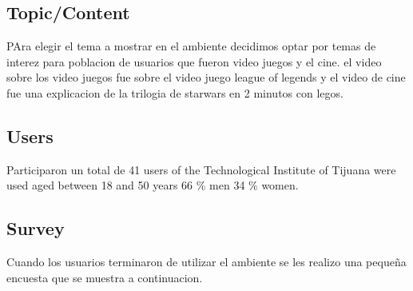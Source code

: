 \subsection{Topic/Content}
PAra elegir el tema a mostrar en el ambiente decidimos optar por temas de interez para poblacion de usuarios que fueron video juegos y el cine. el video sobre los video juegos fue sobre el video juego league of legends y el video de cine fue una explicacion de la trilogia de starwars en 2 minutos con legos.
\subsection{Users}
Participaron un total de 41 users of the Technological Institute of Tijuana were used aged between 18 and 50 years 66 \% men 34 \% women. 
\subsection{Survey}

 Cuando los usuarios terminaron de utilizar el ambiente se les realizo una pequeña encuesta que se muestra a continuacion.

